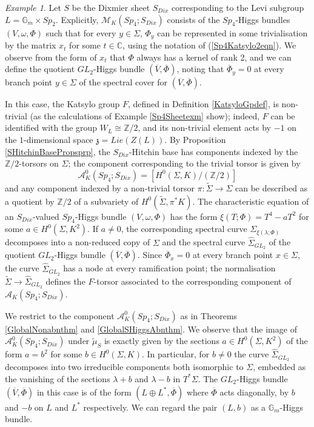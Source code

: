 \documentclass{amsart}
\theoremstyle{remark}
\newtheorem{example}[theorem]{Example}
\numberwithin{theorem}{section}
\numberwithin{equation}{section}
\begin{document}
\begin{example}\label{Sp4SDix2exm}
    Let $S$ be the Dixmier sheet $S_{Dix}$ corresponding to the Levi subgroup $L=\mathbb{G}_m \times Sp_2$. Explicitly, $\mathcal M_K(Sp_4;S_{Dix})$ consists of the $Sp_4$-Higgs bundles $(V,\omega,\Phi)$ such that for every $y \in \Sigma$, $\Phi_y$ can be represented in some trivialisation by the matrix $x_t$ for some $t \in \mathbb{C}$, using the notation of (\ref{Sp4Katsylo2eqn}). We observe from the form of $x_t$ that $\Phi$ always has a kernel of rank 2, and we can define the quotient $GL_2$-Higgs bundle $(\overline{V},\overline{\Phi})$, noting that $\overline{\Phi}_y=0$ at every branch point $y \in \Sigma$ of the spectral cover for $(\overline{V},\overline{\Phi})$.

In this case, the Katsylo group $F$, defined in Definition \ref{KatsyloGpdef}, is non-trivial (as the calculations of Example \ref{Sp4Sheetexm} show); indeed, $F$ can be identified with the group $W_L \cong \mathbb{Z}/2$, and its non-trivial element acts by $-1$ on the $1$-dimensional space $\mathfrak{z} = Lie(Z(L))$. By Proposition \ref{SHitchinBasePropsprp}, the $S_{Dix}$-Hitchin base has components indexed by the $\mathbb{Z}/2$-torsors on $\Sigma$; the component corresponding to the trivial torsor is given by
\begin{equation}\label{Sp4DixHitchinbaseeqn}
    \mathcal A^0_K(Sp_4;S_{Dix}) = [H^0(\Sigma,K)/(\mathbb{Z}/2)]
\end{equation}
and any component indexed by a non-trivial torsor $\pi:\tilde{\Sigma} \rightarrow \Sigma$ can be described as a quotient by $\mathbb{Z}/2$ of a subvariety of $H^0(\tilde{\Sigma},\pi^*K)$. The characteristic equation of an $S_{Dix}$-valued $Sp_4$-Higgs bundle $(V,\omega,\Phi)$ has the form $\xi(T;\Phi) = T^4-aT^2$ for some $a\in H^0(\Sigma,K^2)$. If $a \neq 0$, the corresponding spectral curve ${\Sigma}_{\xi(\lambda;\Phi)}$ decomposes into a non-reduced copy of $\Sigma$ and the spectral curve $\hat{\Sigma}_{GL_2}$ of the quotient $GL_2$-Higgs bundle $(\overline{V},\overline{\Phi})$. Since $\overline{\Phi}_x = 0$ at every branch point $x \in \Sigma$, the curve $\hat{\Sigma}_{GL_2}$ has a node at every ramification point; the normalisation $\tilde{\Sigma} \rightarrow \hat{\Sigma}_{GL_2}$ defines the $F$-torsor associated to the corresponding component of $\mathcal A_K(Sp_4;S_{Dix})$.

We restrict to the component $\mathcal A^0_K(Sp_4;S_{Dix})$ as in Theorems \ref{GlobalNonabnthm} and \ref{GlobalSHiggsAbnthm}. We observe that the image of $\mathcal A^0_K(Sp_4;S_{Dix})$ under $\tilde{\mu}_S$ is exactly given by the sections $a \in H^0(\Sigma,K^2)$ of the form $a = b^2$ for some $b \in H^0(\Sigma,K)$. In particular, for $b \neq 0$ the curve ${\hat\Sigma}_{GL_2}$ decomposes into two irreducible components both isomorphic to $\Sigma$, embedded as the vanishing of the sections $\lambda + b$ and $\lambda - b$ in $T^*\Sigma$. The $GL_2$-Higgs bundle $(\overline{V},\overline{\Phi})$ in this case is of the form $(L \oplus L^*,\overline{\Phi})$ where $\overline{\Phi}$ acts diagonally, by $b$ and $-b$ on $L$ and $L^*$ respectively. We can regard the pair $(L,b)$ as a $\mathbb{G}_m$-Higgs bundle.


\end{example}
\end{document}
